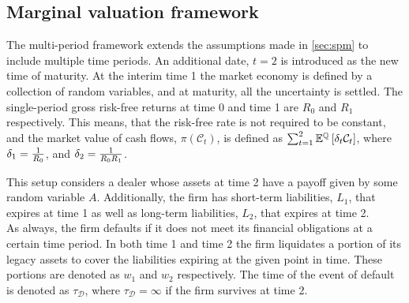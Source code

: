\documentclass[main.tex]{subfiles}
\begin{document}
    \subsection{Marginal valuation framework}
        The multi-period framework extends the assumptions made in \cref{sec:spm} to include multiple time periods.
        An additional date, $t=2$ is introduced as the new time of maturity.
        At the interim time 1 the market economy is defined by a collection of random variables,
        and at maturity, all the uncertainty is settled. 
        The single-period gross risk-free returns at time 0 and time 1 are $R_0$ and $R_1$ respectively. This means, that the risk-free rate is not required to be constant, and the market value of cash flows, $\pi(\mathcal{C}_{t})$, is defined as $\sum_{t=1}^{2}\mathbb{E}^{\mathbb{Q}}\left[\delta_t \mathcal{C}_{t}\right]$, where $\delta_1 = \frac{1}{R_{0}}$, and $\delta_2 = \frac{1}{R_{0}R_{1}}$.

        This setup considers a dealer whose assets at time 2 have a payoff given by some random variable $A$. Additionally, the firm has short-term liabilities, $L_1$, that expires at time 1 as well as long-term liabilities, $L_2$, that expires at time 2.
        \\
        As always, the firm defaults if it does not meet its financial obligations at a certain time period. In both time 1 and time 2 the firm liquidates a portion of its legacy assets to cover the liabilities expiring at the given point in time. These portions are denoted as $w_{1}$ and $w_{2}$ respectively. The time of the event of default is denoted as $\tau_{\mathcal{D}}$, where $\tau_{\mathcal{D}} = \infty$ if the firm survives at time 2.
\end{document}
